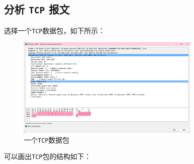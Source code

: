 \documentclass{article}
\begin{document}
\subsection{分析 \texttt{TCP} 报文}

选择一个\texttt{TCP}数据包，如下所示：

\begin{figure}[H]
  \centering
  \includegraphics[width=0.79\textwidth]{img/5.png}
  \caption{一个\texttt{TCP}数据包}
\end{figure}

可以画出\texttt{TCP}包的结构如下：
\end{document}
